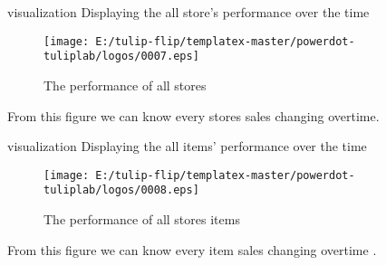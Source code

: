 \documentclass[
 size=12pt,
 paper=smartboard, %
 mode=present, %
 display=slides, %
style=tuliplab,
pauseslide,
fleqn,leqno]{powerdot}
\begin{document}
\begin{slide}[toc=,bm=]{visualization}
  Displaying the all store's performance over the time
  \vspace{1cm} 
  \begin{figure}[ht]%
    \centering%
    \texttt{[image: E:/tulip-flip/templatex-master/powerdot-tuliplab/logos/0007.eps]}
    \caption{The performance of all stores}%
    \end{figure}
    From this figure we can know every stores sales changing overtime.
  \end{slide}



\begin{slide}[toc=,bm=]{visualization}
  Displaying the all items' performance over the time
  \vspace{1.2cm} 
  \begin{figure}[ht]%
    \centering%
    \texttt{[image: E:/tulip-flip/templatex-master/powerdot-tuliplab/logos/0008.eps]}
    \caption{The performance of all stores items}%
    \end{figure}
    From this figure we can know every item sales changing overtime .
  \end{slide}


\end{document}
